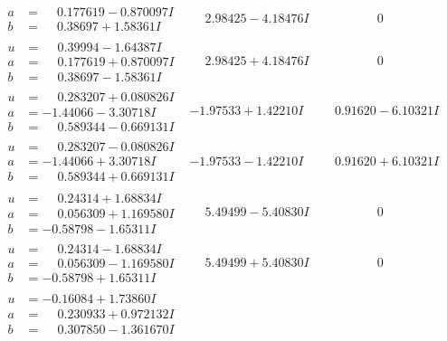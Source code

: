 \documentclass[1p]{elsarticle_modified}
\theoremstyle{definition}
\begin{document}
$$\begin{array}{c|c|c}
\begin{aligned}
a &= \phantom{-}0.177619 - 0.870097 I \\
b &= \phantom{-}0.38697 + 1.58361 I\end{aligned}
 & \phantom{-}2.98425 - 4.18476 I & \phantom{-0.000000 } 0 \\ \hline\begin{aligned}
u &= \phantom{-}0.39994 - 1.64387 I \\
a &= \phantom{-}0.177619 + 0.870097 I \\
b &= \phantom{-}0.38697 - 1.58361 I\end{aligned}
 & \phantom{-}2.98425 + 4.18476 I & \phantom{-0.000000 } 0 \\ \hline\begin{aligned}
u &= \phantom{-}0.283207 + 0.080826 I \\
a &= -1.44066 - 3.30718 I \\
b &= \phantom{-}0.589344 - 0.669131 I\end{aligned}
 & -1.97533 + 1.42210 I & \phantom{-}0.91620 - 6.10321 I \\ \hline\begin{aligned}
u &= \phantom{-}0.283207 - 0.080826 I \\
a &= -1.44066 + 3.30718 I \\
b &= \phantom{-}0.589344 + 0.669131 I\end{aligned}
 & -1.97533 - 1.42210 I & \phantom{-}0.91620 + 6.10321 I \\ \hline\begin{aligned}
u &= \phantom{-}0.24314 + 1.68834 I \\
a &= \phantom{-}0.056309 + 1.169580 I \\
b &= -0.58798 - 1.65311 I\end{aligned}
 & \phantom{-}5.49499 - 5.40830 I & \phantom{-0.000000 } 0 \\ \hline\begin{aligned}
u &= \phantom{-}0.24314 - 1.68834 I \\
a &= \phantom{-}0.056309 - 1.169580 I \\
b &= -0.58798 + 1.65311 I\end{aligned}
 & \phantom{-}5.49499 + 5.40830 I & \phantom{-0.000000 } 0 \\ \hline\begin{aligned}
u &= -0.16084 + 1.73860 I \\
a &= \phantom{-}0.230933 + 0.972132 I \\
b &= \phantom{-}0.307850 - 1.361670 I\end{aligned}

\end{array}$$
\end{document}
